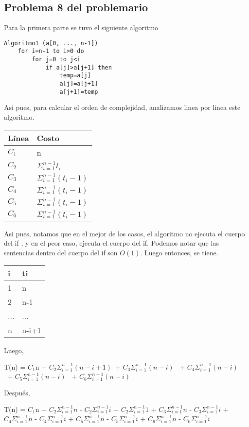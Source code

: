\documentclass[12pt,twoside]{article}
\begin{document}
\subsection{Problema 8 del problemario}
Para la primera parte se tuvo el siguiente algoritmo
\begin{lstlisting}
Algoritmo1 (a[0, ..., n-1])
    for i=n-1 to i>0 do
        for j=0 to j<i
            if a[j]>a[j+1] then
                temp=a[j]
                a[j]=a[j+1]
                a[j+1]=temp
\end{lstlisting}
Asi pues, para calcular el orden de complejidad, analizamos linea por linea este
algoritmo.
\begin{center}
\begin{tabular}{|l|l|}
\hline
Línea & Costo\\
\hline
$C_{1}$ &n\\
\hline
$C_{2}$ & $\Sigma_{i=1}^{n-1}t_{i}$\\
\hline
$C_{3}$ & $\Sigma_{i=1}^{n-1}(t_{i}-1)$ \\
\hline
$C_{4}$ & $\Sigma_{i=1}^{n-1}(t_{i}-1)$ \\
\hline
$C_{5}$ & $\Sigma_{i=1}^{n-1}(t_{i}-1)$ \\
\hline
$C_{6}$ & $\Sigma_{i=1}^{n-1}(t_{i}-1)$ \\
\hline
\end{tabular}
\end{center}
Asi pues, notamos que en el mejor de los casos, el algoritmo no ejecuta el cuerpo del if , y en el peor caso, ejecuta el cuerpo del if. Podemos notar que las sentencias dentro del cuerpo del if son $O(1)$.
Luego entonces, se tiene.
\begin{center}
\begin{tabular}{|l|l|}
\hline
i & ti\\
\hline
1 & n\\
\hline
2 & n-1\\
\hline
... & ...\\
\hline
n & n-i+1\\
\hline
\end{tabular}
\end{center}
Luego,
\begin{center}
T(n) = $C_{1}$n + $C_{2}\Sigma_{i=1}^{n-1}(n-i+1)$\ + $C_{3}\Sigma_{i=1}^{n-1}(n-i)$ \ + $C_{4}\Sigma_{i=1}^{n-1}(n-i)$ \ + $C_{5}\Sigma_{i=1}^{n-1}(n-i)$ \ + $C_{6}\Sigma_{i=1}^{n-1}(n-i)$ \\
\end{center}
Después,
\begin{center}
T(n) = $C_{1}$n + $C_{2}\Sigma_{i=1}^{n-1}n$ - $C_{2}\Sigma_{i=1}^{n-1}i$ +
$C_{2}\Sigma_{i=1}^{n-1}1$ + $C_{3}\Sigma_{i=1}^{n-1}n$ - $C_{3}\Sigma_{i=1}^{n-1}i$ + $C_{4}\Sigma_{i=1}^{n-1}n$ - $C_{4}\Sigma_{i=1}^{n-1}i$ + $C_{5}\Sigma_{i=1}^{n-1}n$ - $C_{5}\Sigma_{i=1}^{n-1}i$ + $C_{6}\Sigma_{i=1}^{n-1}n$ - $C_{6}\Sigma_{i=1}^{n-1}i$ \\
\end{center}
\end{document}
